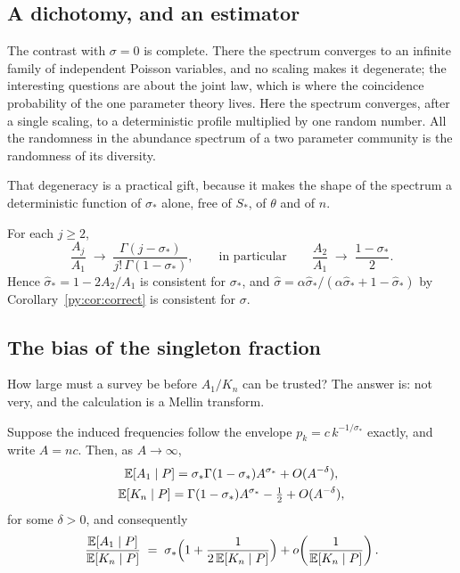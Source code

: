 \subsection{A dichotomy, and an estimator}

The contrast with $\sigma = 0$ is complete. There the spectrum converges to an infinite family of
independent Poisson variables, and no scaling makes it degenerate; the interesting questions are
about the joint law, which is where the coincidence probability of the one parameter theory lives.
Here the spectrum converges, after a single scaling, to a deterministic profile multiplied by one
random number. All the randomness in the abundance spectrum of a two parameter community is the
randomness of its diversity.

That degeneracy is a practical gift, because it makes the shape of the spectrum a deterministic
function of $\sigma_*$ alone, free of $S_*$, of $\theta$ and of $n$.

\begin{corollary}
\label{py:cor:spectrum}
For each $j \ge 2$,
\begin{equation}
\frac{A_j}{A_1} \;\longrightarrow\; \frac{\Gamma(j-\sigma_*)}{j!\,\Gamma(1-\sigma_*)} ,
\qquad\text{in particular}\qquad
\frac{A_2}{A_1} \;\longrightarrow\; \frac{1-\sigma_*}{2} .
\label{py:eq:spectrum}
\end{equation}
Hence $\hat\sigma_* = 1 - 2A_2/A_1$ is consistent for $\sigma_*$, and
$\hat\sigma = \alpha\hat\sigma_*/(\alpha\hat\sigma_*+1-\hat\sigma_*)$ by
Corollary~\ref{py:cor:correct} is consistent for $\sigma$.
\end{corollary}

\subsection{The bias of the singleton fraction}
\label{py:sec:rate}

How large must a survey be before $A_1/K_n$ can be trusted? The answer is: not very, and the
calculation is a Mellin transform.

\begin{proposition}
\label{py:prop:rate}
Suppose the induced frequencies follow the envelope $p_k = c\,k^{-1/\sigma_*}$ exactly, and write
$A = nc$. Then, as $A \to \infty$,
\[
\begin{gathered}
\mathbb{E}[A_1 \mid P] = \sigma_*\Gamma(1-\sigma_*)A^{\sigma_*} + O(A^{-\delta}),
\\
\mathbb{E}[K_n \mid P] = \Gamma(1-\sigma_*)A^{\sigma_*} - \tfrac12 + O(A^{-\delta}),
\end{gathered}
\]
for some $\delta > 0$, and consequently
\begin{equation}
\frac{\mathbb{E}[A_1\mid P]}{\mathbb{E}[K_n\mid P]} \;=\; \sigma_*\Big(1 + \frac{1}{2\,\mathbb{E}[K_n\mid P]}\Big) + o\!\left(\frac{1}{\mathbb{E}[K_n\mid P]}\right).
\label{py:eq:rate}
\end{equation}
\end{proposition}

